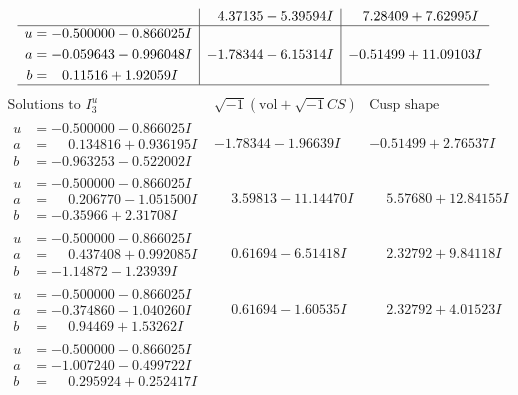 \documentclass[1p]{elsarticle_modified}
\theoremstyle{definition}
\newcommand{\I}{\sqrt{-1}}
\begin{document}
$$\begin{array}{c|c|c}
 & \phantom{-}4.37135 - 5.39594 I & \phantom{-}7.28409 + 7.62995 I \\ \hline\begin{aligned}
u &= -0.500000 - 0.866025 I \\
a &= -0.059643 - 0.996048 I \\
b &= \phantom{-}0.11516 + 1.92059 I\end{aligned}
 & -1.78344 - 6.15314 I & -0.51499 + 11.09103 I\\
 \hline 
 \end{array}$$\newpage$$\begin{array}{c|c|c}  
\text{Solutions to }I^u_{3}& \I (\text{vol} + \sqrt{-1}CS) & \text{Cusp shape}\\
 \hline 
\begin{aligned}
u &= -0.500000 - 0.866025 I \\
a &= \phantom{-}0.134816 + 0.936195 I \\
b &= -0.963253 - 0.522002 I\end{aligned}
 & -1.78344 - 1.96639 I & -0.51499 + 2.76537 I \\ \hline\begin{aligned}
u &= -0.500000 - 0.866025 I \\
a &= \phantom{-}0.206770 - 1.051500 I \\
b &= -0.35966 + 2.31708 I\end{aligned}
 & \phantom{-}3.59813 - 11.14470 I & \phantom{-}5.57680 + 12.84155 I \\ \hline\begin{aligned}
u &= -0.500000 - 0.866025 I \\
a &= \phantom{-}0.437408 + 0.992085 I \\
b &= -1.14872 - 1.23939 I\end{aligned}
 & \phantom{-}0.61694 - 6.51418 I & \phantom{-}2.32792 + 9.84118 I \\ \hline\begin{aligned}
u &= -0.500000 - 0.866025 I \\
a &= -0.374860 - 1.040260 I \\
b &= \phantom{-}0.94469 + 1.53262 I\end{aligned}
 & \phantom{-}0.61694 - 1.60535 I & \phantom{-}2.32792 + 4.01523 I \\ \hline\begin{aligned}
u &= -0.500000 - 0.866025 I \\
a &= -1.007240 - 0.499722 I \\
b &= \phantom{-}0.295924 + 0.252417 I\end{aligned}

\end{array}$$
\end{document}
